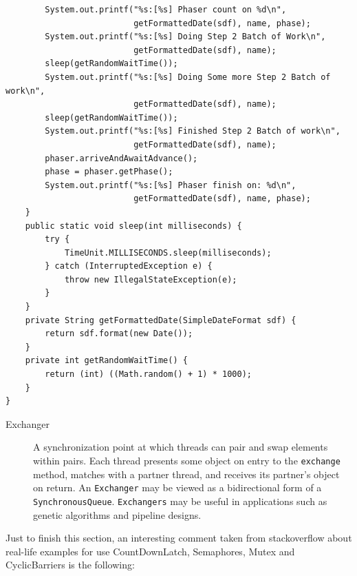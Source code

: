 \documentclass{latex/classes/thesis}
\begin{document}
\begin{lstlisting}
        System.out.printf("%s:[%s] Phaser count on %d\n",
                          getFormattedDate(sdf), name, phase);
        System.out.printf("%s:[%s] Doing Step 2 Batch of Work\n",
                          getFormattedDate(sdf), name);
        sleep(getRandomWaitTime());
        System.out.printf("%s:[%s] Doing Some more Step 2 Batch of work\n",
                          getFormattedDate(sdf), name);
        sleep(getRandomWaitTime());
        System.out.printf("%s:[%s] Finished Step 2 Batch of work\n",
                          getFormattedDate(sdf), name);
        phaser.arriveAndAwaitAdvance();
        phase = phaser.getPhase();
        System.out.printf("%s:[%s] Phaser finish on: %d\n",
                          getFormattedDate(sdf), name, phase);
    }
    public static void sleep(int milliseconds) {
        try {
            TimeUnit.MILLISECONDS.sleep(milliseconds);
        } catch (InterruptedException e) {
            throw new IllegalStateException(e);
        }
    }
    private String getFormattedDate(SimpleDateFormat sdf) {
        return sdf.format(new Date());
    }
    private int getRandomWaitTime() {
        return (int) ((Math.random() + 1) * 1000);
    }
}
\end{lstlisting}

\begin{description}
\item[{Exchanger}] A synchronization point at which threads can pair and swap
elements within pairs. Each thread presents some object on entry to the
\texttt{exchange} method, matches with a partner thread, and receives its partner's
object on return. An \texttt{Exchanger} may be viewed as a bidirectional form of a
\texttt{SynchronousQueue}. \texttt{Exchangers} may be useful in applications such as genetic
algorithms and pipeline designs.
\end{description}

Just to finish this section, an interesting comment taken from stackoverflow
about real-life examples for use CountDownLatch, Semaphores, Mutex and
CyclicBarriers is the following:
\end{document}

